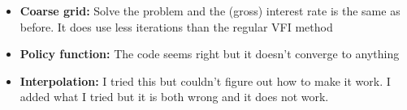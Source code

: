 \documentclass[12pt]{article}%
\begin{document}
\begin{enumerate}
	\begin{itemize}
		\item \textbf{Coarse grid:} Solve the problem and the (gross) interest rate is the same as before. It does use less iterations than the regular VFI method
		\item \textbf{Policy function:} The code seems right but it doesn't converge to anything
		\item  \textbf{Interpolation:} I tried this but couldn't figure out how to make it work. I added what I tried but it is both wrong and it does not work. 
	\end{itemize}
	
	
\end{enumerate}

\strut

\onehalfspacing
\end{document}
